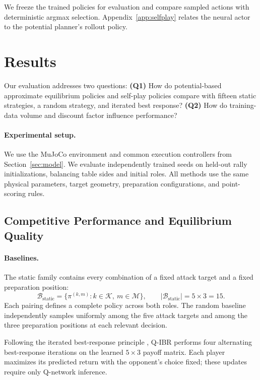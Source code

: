 \documentclass[pmlr]{jmlr}
\begin{document}
We freeze the trained policies for evaluation and compare sampled actions with deterministic argmax selection. Appendix~\ref{app:selfplay} relates the neural actor to the potential planner's rollout policy.

\section{Results}
\label{sec:results}

Our evaluation addresses two questions: \textbf{(Q1)} How do potential-based approximate equilibrium policies and self-play policies compare with fifteen static strategies, a random strategy, and iterated best response? \textbf{(Q2)} How do training-data volume and discount factor influence performance?

\paragraph{Experimental setup.}
We use the MuJoCo environment and common execution controllers from Section~\ref{sec:model}. We evaluate independently trained seeds on held-out rally initializations, balancing table sides and initial roles. All methods use the same physical parameters, target geometry, preparation configurations, and point-scoring rules.

\subsection{Competitive Performance and Equilibrium Quality}
\label{sec:resultsperformance}

\paragraph{Baselines.}
The static family contains every combination of a fixed attack target and a fixed preparation position:
\begin{equation}
  \mathcal{B}_{\mathrm{static}}=
  \{\pi^{(k,m)}:k\in\mathcal{K},\ m\in\mathcal{M}\},
  \qquad |\mathcal{B}_{\mathrm{static}}|=5\times3=15.
  \label{eq:staticbaselines}
\end{equation}
Each pairing defines a complete policy across both roles. The random baseline independently samples uniformly among the five attack targets and among the three preparation positions at each relevant decision.

Following the iterated best-response principle \citep{spica2020drone}, Q-IBR performs four alternating best-response iterations on the learned $5\times3$ payoff matrix. Each player maximizes its predicted return with the opponent's choice fixed; these updates require only Q-network inference.
\end{document}
